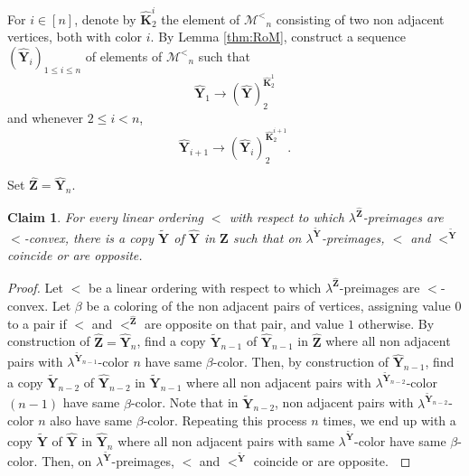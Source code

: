 \documentclass[reqno]{amsart}
\newtheorem{claimm}{Claim}
\begin{document}
For $i \in [n]$, denote by ${\widehat{\textbf{{K}}}}_2 ^i$ the element of ${\mathcal{M}^<} _n$ consisting of two non adjacent vertices, both with color $i$. By Lemma \ref{thm:RoM}, construct a sequence $({\widehat{\textbf{{Y}}}}_i)_{1\leq i \leq n}$ of elements of ${\mathcal{M}^<}_n$ such that \[ {\widehat{\textbf{{Y}}}}_1 {\longrightarrow {{({\widehat{\textbf{{Y}}}})}}^{{{\widehat{\textbf{{K}}}}_2 ^1}}_{{2}}} \] and whenever $2\leq i < n$, \[ {\widehat{\textbf{{Y}}}}_{i+1} {\longrightarrow {{({\widehat{\textbf{{Y}}}}_i)}}^{{{\widehat{\textbf{{K}}}}_2 ^{i+1}}}_{{2}}}. \] 

Set ${\widehat{\textbf{{Z}}}}={\widehat{\textbf{{Y}}}}_{n}$. 

\begin{claimm}
\label{claim:<}
For every linear ordering $<$ with respect to which $\lambda^{{\widehat{\textbf{{Z}}}}}$-preimages are $<$-convex, there is a copy ${\widetilde{\textbf{{Y}}}}$ of ${\widehat{\textbf{{Y}}}}$ in ${\widehat{\textbf{{Z}}}}$ such that on $\lambda^{{\widetilde{\textbf{{Y}}}}}$-preimages, $<$ and $<^{{\widetilde{\textbf{{Y}}}}}$ coincide or are opposite. 
\end{claimm}

\begin{proof}

Let $<$ be a linear ordering with respect to which $\lambda^{{\widehat{\textbf{{Z}}}}}$-preimages are $<$-convex. Let $\beta$ be a coloring of the non adjacent pairs of vertices, assigning value $0$ to a pair if $<$ and $<^{{\widehat{\textbf{{Z}}}}}$ are opposite on that pair, and value $1$ otherwise. By construction of ${\widehat{\textbf{{Z}}}}={\widehat{\textbf{{Y}}}}_n$, find a copy ${\widetilde{\textbf{{Y}}}}_{n-1}$ of ${\widehat{\textbf{{Y}}}}_{n-1}$ in ${\widehat{\textbf{{Z}}}}$ where all non adjacent pairs with $\lambda^{{\widetilde{\textbf{{Y}}}}_{n-1}}$-color $n$ have same $\beta$-color. Then, by construction of ${\widehat{\textbf{{Y}}}}_{n-1}$, find a copy ${\widetilde{\textbf{{Y}}}}_{n-2}$ of ${\widehat{\textbf{{Y}}}}_{n-2}$ in ${\widetilde{\textbf{{Y}}}}_{n-1}$ where all non adjacent pairs with $\lambda^{{\widetilde{\textbf{{Y}}}}_{n-2}}$-color $(n-1)$ have same $\beta$-color. Note that in ${\widetilde{\textbf{{Y}}}}_{n-2}$, non adjacent pairs with $\lambda^{{\widetilde{\textbf{{Y}}}}_{n-2}}$-color $n$ also have same $\beta$-color. Repeating this process $n$ times, we end up with a copy ${\widetilde{\textbf{{Y}}}}$ of ${\widehat{\textbf{{Y}}}}$ in ${\widehat{\textbf{{Y}}}}_{n}$ where all non adjacent pairs with same $\lambda^{{\widetilde{\textbf{{Y}}}}}$-color have same $\beta$-color. Then, on $\lambda^{{\widetilde{\textbf{{Y}}}}}$-preimages, $<$ and $<^{{\widetilde{\textbf{{Y}}}}}$ coincide or are opposite. $\qedhere$ \end{proof}
\end{document}
